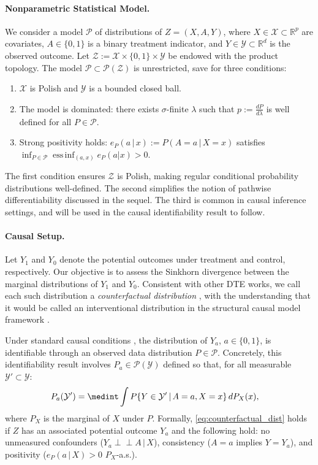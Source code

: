 \documentclass{article}
\theoremstyle{plain}
\theoremstyle{definition}
\theoremstyle{remark}
\newcommand{\R}{\mathbb{R}}
\newcommand{\cZ}{\mathcal{Z}}
\newcommand{\cP}{\mathcal{P}}
\newcommand{\cY}{\mathcal{Y}}
\newcommand{\cX}{\mathcal{X}}
\newcommand{\1}{\mathbbm{1}}
\theoremstyle{plain}
\theoremstyle{definition}
\newcommand{\ind}{\mathrel{\perp\!\!\!\perp}}
\DeclareMathOperator*{\essinf}{ess\,inf}
\newcommand{\mymid}{\,|\,}
\begin{document}
\paragraph{Nonparametric Statistical Model.}
We consider a model $\cP$ of distributions of $Z= (X, A, Y)$, where $X \in \cX \subset \R^p$ are covariates, $A \in \{0,1\}$ is a binary treatment indicator, and $Y \in \cY \subset \R^d$ is the observed outcome. Let $\cZ := \cX \times \{0,1\} \times \cY$ be endowed with the product topology. The model $\cP\subset \cP(\cZ)$ is unrestricted, save for three conditions:
\begin{enumerate}[noitemsep]
    \item $\cX$ is Polish and $\cY$ is a bounded closed ball.
    \item The model is dominated: there exists $\sigma$-finite $\lambda$ such that $p:=\frac{dP}{d\lambda}$ is well defined for all $P\in \cP$.
    \item Strong positivity holds: $e_P(a\mymid x):= P(A=a\mymid X=x)$ satisfies $\inf_{P \in \cP} \essinf_{(a,x)} e_P(a|x) > 0$.
\end{enumerate}
The first condition ensures $\cZ$ is Polish, making regular conditional probability distributions well-defined. The second simplifies the notion of pathwise differentiability discussed in the sequel. The third is common in causal inference settings, and will be used in the causal identifiability result to follow.

\paragraph{Causal Setup.}
Let $Y_1$ and $Y_0$ denote the potential outcomes under treatment and control, respectively. Our objective is to assess the Sinkhorn divergence between the marginal distributions of $Y_1$ and $Y_0$. Consistent with other DTE works, we call each such distribution a \emph{counterfactual distribution} \citep{martinez2023efficient,kennedy2023semiparametric}, with the understanding that it would be called an interventional distribution in the structural causal model framework \citep{bareinboim2022pearl}.

Under standard causal conditions \citep{hernan2024causal}, the distribution of $Y_a$, $a\in \{0,1\}$, is identifiable through an observed data distribution $P\in\cP$. Concretely, this identifiability result involves $P_a\in \cP(\cY)$ defined so that, for all measurable $\cY'\subset \cY$:
\begin{align}\label{eq:counterfactual_dist}
    P_a(\cY')&= \medint\int P\{Y\in \cY'\mymid A=a,X=x\}\, dP_X(x),
\end{align}
where $P_X$ is the marginal of $X$ under $P$. 
Formally, \eqref{eq:counterfactual_dist} holds if $Z$ has an associated potential outcome $Y_a$ and the following hold: no unmeasured confounders ($Y_a\ind A\mymid X$), consistency ($A=a$ implies $Y=Y_a$), and positivity ($e_P(a\mymid X)>0$ $P_X$-a.s.).
\end{document}

